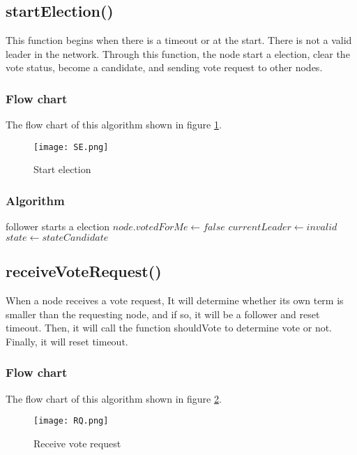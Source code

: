 \documentclass{report}
\begin{document}
\subsection{startElection()}
This function begins when there is a timeout or at the start. There is not a valid leader in the network. Through this function, the node start a election, clear the vote status, become a candidate, and sending vote request to other nodes.
\subsubsection{Flow chart}
The flow chart of this algorithm shown in figure \ref{fig:SE}.
\begin{figure}[H]
    \centering
    \texttt{[image: SE.png]}
    \caption{Start election}
    \label{fig:SE}
\end{figure}

\subsubsection{Algorithm}
\begin{simpleAlgorithm}{follower starts a election}
    \State {} 
        \State $node.votedForMe \gets false$  
    \EndFor
    \State {} 
    \State $currentLeader \gets invalid$
    \State $state \gets stateCandidate$
            \State {}
        \EndIf
    \EndFor
    \State {} 
   \EndProcedure
\end{simpleAlgorithm}


\subsection{receiveVoteRequest()}
When a node receives a vote request, It will determine whether its own term is smaller than the requesting node, and if so, it will be a follower and reset timeout. Then, it will call the function shouldVote to determine vote or not. Finally, it will reset timeout.
\subsubsection{Flow chart}
The flow chart of this algorithm shown in figure \ref{fig:RQ}.
\begin{figure}[H]
    \centering
    \texttt{[image: RQ.png]}
    \caption{Receive vote request}
    \label{fig:RQ}
\end{figure}
\end{document}
